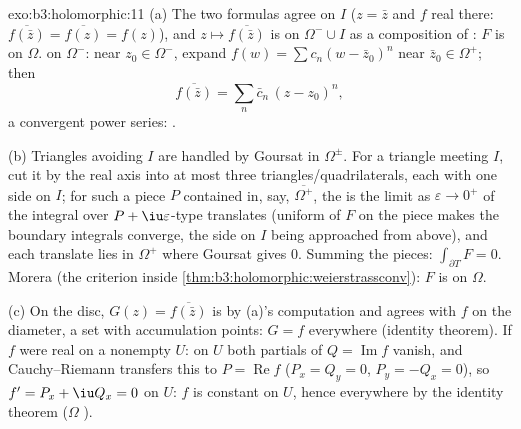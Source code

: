 \begin{solution}{exo:b3:holomorphic:11}
(a) The two formulas agree on $I$ ($z = \bar z$ and $f$ real
there: $\overline{f(\bar z)} = \overline{f(z)} = f(z)$), and
$z \mapsto \overline{f(\bar z)}$ is  on
$\Omega^-\cup I$ as a composition of : $F$ is
 on $\Omega$.  on $\Omega^-$: near $z_0
\in \Omega^-$, expand $f(w) = \sum c_n(w - \bar z_0)^n$ near
$\bar z_0 \in \Omega^+$; then
\[
\overline{f(\bar z)} = \sum_n\bar c_n\,(z - z_0)^n,
\]
a convergent power series: .

(b) Triangles avoiding $I$ are handled by Goursat in
$\Omega^\pm$. For a triangle meeting $I$, cut it by the real
axis into at most three triangles/quadrilaterals, each with
one side on $I$; for such a piece $P$ contained in, say,
$\overline{\Omega^+}$, the  is the limit as
$\varepsilon \to 0^+$ of the integral over $P + \iu
\varepsilon$-type translates (uniform  of $F$ on
the  piece makes the boundary integrals converge, the
side on $I$ being approached from above), and each translate
lies in $\Omega^+$ where Goursat gives $0$. Summing the
pieces: $\int_{\partial T}F = 0$. Morera (the criterion
inside \cref{thm:b3:holomorphic:weierstrassconv}): $F$ is
 on $\Omega$.

(c) On the disc, $G(z) = \overline{f(\bar z)}$ is
 by (a)'s computation and agrees with $f$ on the
diameter, a set with accumulation points: $G = f$ everywhere
(identity theorem). If $f$ were real on a nonempty 
$U$: on $U$ both partials of $Q = \operatorname{Im}f$
vanish, and Cauchy--Riemann transfers this to $P =
\operatorname{Re}f$ ($P_x = Q_y = 0$, $P_y = -Q_x = 0$), so
$f' = P_x + \iu Q_x = 0$ on $U$: $f$ is constant on $U$,
hence everywhere by the identity theorem ($\Omega$
).
\end{solution}

